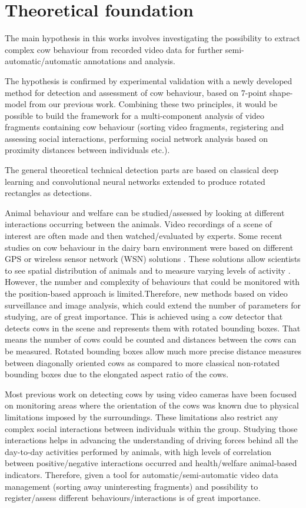 \documentclass[10pt,a4paper]{article}
\begin{document}
\section{Theoretical foundation}

The main hypothesis in this works involves investigating the possibility to extract complex cow behaviour from recorded video data for further semi-automatic/automatic annotations and analysis. 

The hypothesis is confirmed by experimental validation with a newly developed method for detection and assessment of cow behaviour, based on 7-point shape-model \cite{guzhva2016feasibility} from our previous work. Combining these two principles, it would be possible to build the framework for a multi-component analysis of video fragments containing cow behaviour (sorting video fragments, registering and assessing social interactions, performing social network analysis based on proximity distances between individuals etc.).

The general theoretical technical detection parts are based on classical deep learning and convolutional neural networks extended to produce rotated rectangles as detections.


Animal behaviour and welfare can be studied/assessed by looking at different interactions occurring between the animals. Video recordings of a scene of interest are often made and then watched/evaluated by experts. Some recent studies on cow behaviour in the dairy barn environment were based on different GPS or wireless sensor network (WSN) solutions \cite{Nadimietal2012}. These solutions allow scientists to see spatial distribution of animals and to measure varying levels of activity \cite{Nadimietal2012}. However, the number and complexity of behaviours that could be monitored with the position-based approach is limited.Therefore, new methods based on video surveillance and image analysis, which could extend the number of parameters for studying, are of great importance. This is achieved using a cow detector that detects cows in the scene and represents them with rotated bounding boxes. That means the number of cows could be counted and distances between the cows can be measured. Rotated bounding boxes allow much more precise distance measures between diagonally oriented cows as compared to more classical non-rotated bounding boxes due to the elongated aspect ratio of the cows.

Most previous work on detecting cows by using video cameras have been focused on monitoring areas where the orientation of the cows was known due to physical limitations imposed by the surroundings. These limitations also restrict any complex social interactions between individuals within the group. Studying those interactions helps in advancing the understanding of driving forces behind all the day-to-day activities performed by animals, with high levels of correlation between positive/negative interactions occurred and health/welfare  animal-based indicators. Therefore, given a tool for automatic/semi-automatic video data management (sorting away uninteresting fragments) and possibility to register/assess different behaviours/interactions is of great importance. 
\end{document}
